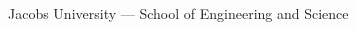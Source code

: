 \begin{titlepage}
\begin{addmargin}[-1cm]{-3cm}
\begin{center}
        \begin{center}
          \smallskip
          \large Jacobs University --- School of Engineering and Science
        \end{center}
    \end{center}
  \end{addmargin}
\end{titlepage}
